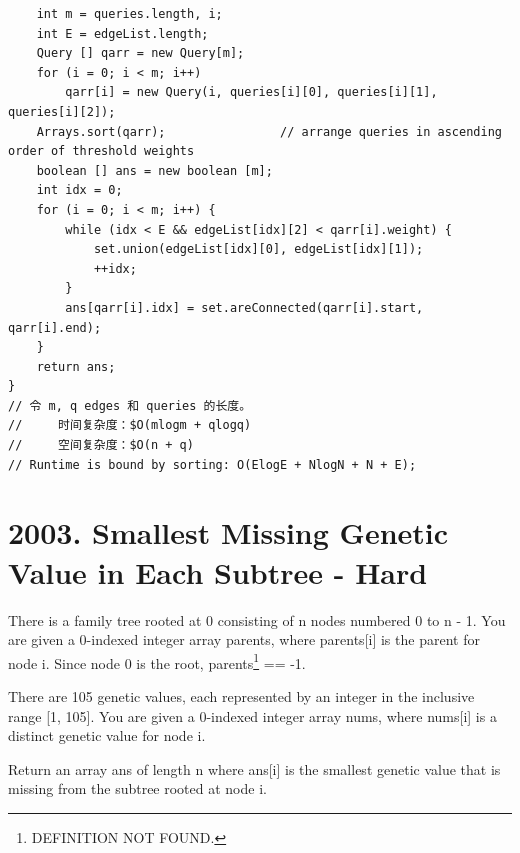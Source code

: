 \documentclass[9pt, b5paaper]{book}
\begin{document}
\begin{verbatim}
    int m = queries.length, i;
    int E = edgeList.length;
    Query [] qarr = new Query[m];
    for (i = 0; i < m; i++) 
        qarr[i] = new Query(i, queries[i][0], queries[i][1], queries[i][2]);
    Arrays.sort(qarr);                // arrange queries in ascending order of threshold weights
    boolean [] ans = new boolean [m];
    int idx = 0;
    for (i = 0; i < m; i++) {
        while (idx < E && edgeList[idx][2] < qarr[i].weight) {
            set.union(edgeList[idx][0], edgeList[idx][1]);
            ++idx;
        }
        ans[qarr[i].idx] = set.areConnected(qarr[i].start, qarr[i].end);
    }
    return ans;
}
// 令 m, q edges 和 queries 的长度。
//     时间复杂度：$O(mlogm + qlogq)
//     空间复杂度：$O(n + q)
// Runtime is bound by sorting: O(ElogE + NlogN + N + E);
\end{verbatim}

\section{2003. Smallest Missing Genetic Value in Each Subtree - Hard}
\label{sec-6-2}
There is a family tree rooted at 0 consisting of n nodes numbered 0 to n - 1. You are given a 0-indexed integer array parents, where parents[i] is the parent for node i. Since node 0 is the root, parents\footnote{DEFINITION NOT FOUND.} == -1.

There are 105 genetic values, each represented by an integer in the inclusive range [1, 105]. You are given a 0-indexed integer array nums, where nums[i] is a distinct genetic value for node i.

Return an array ans of length n where ans[i] is the smallest genetic value that is missing from the subtree rooted at node i.
\end{document}
